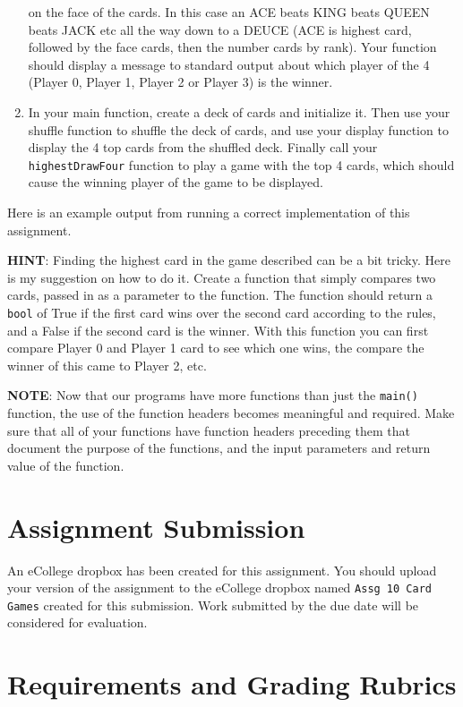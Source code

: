 \documentclass[11pt]{article}
\begin{document}
\begin{enumerate}
   on the face of the cards.  In this case an ACE beats KING beats
   QUEEN beats JACK etc all the way down to a DEUCE (ACE is highest
   card, followed by the face cards, then the number cards by rank).
   Your function should display a message to standard output about
   which player of the 4 (Player 0, Player 1, Player 2 or Player 3)
   is the winner.
\item In your main function, create a deck of cards and initialize it.
   Then use your shuffle function to shuffle the deck of cards, and
   use your display function to display the 4 top cards from the
   shuffled deck.  Finally call your \verb~highestDrawFour~ function
   to play a game with the top 4 cards, which should cause
   the winning player of the game to be displayed.
\end{enumerate}

Here is an example output from running a correct implementation of
this assignment.


\textbf{HINT}: Finding the highest card in the game described can be a bit
tricky.  Here is my suggestion on how to do it.  Create a function
that simply compares two cards, passed in as a parameter to the
function.  The function should return a \verb~bool~ of True if the first card
wins over the second card according to the rules, and a False if the
second card is the winner.  With this function you can first compare
Player 0 and Player 1 card to see which one wins, the compare the
winner of this came to Player 2, etc.

\textbf{NOTE}: Now that our programs have more functions than just the
\verb~main()~ function, the use of the function headers becomes meaningful
and required.  Make sure that all of your functions have function
headers preceding them that document the purpose of the functions, and
the input parameters and return value of the function.
\section*{Assignment Submission}
\label{sec-4}


An eCollege dropbox has been created for this assignment.  You should
upload your version of the assignment to the eCollege dropbox named
\verb~Assg 10 Card Games~ created for this submission.  Work
submitted by the due date will be considered for evaluation.
\section*{Requirements and Grading Rubrics}
\label{sec-5}
\end{document}
